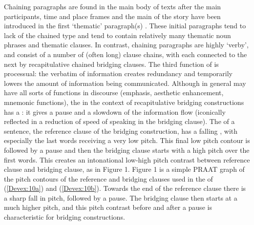 \documentclass[output=paper]{LSP/langsci}
\begin{document}
Chaining paragraphs are found in the main body of  texts after  the main participants, time and place frames and the main  of the story have been introduced in the first `thematic' paragraph(s) \citep[][369]{devries.2005}. These initial paragraphs tend to lack  of the chained type and tend to contain relatively many thematic noun phrases and thematic clauses. In contrast, chaining paragraphs are highly `verby', and consist of a number of (often long) clause chains, with each  connected to the next by recapitulative chained bridging clauses. The third function of  is processual: the verbatim   of information creates redundancy and temporarily lowers the amount of information being communicated. Although  in general may have all sorts of functions in discourse (emphasis, aesthetic enhancement, mnemonic functions), the  in the context of recapitulative bridging constructions has a : it gives a pause and a slowdown of the information flow (iconically reflected in a reduction of speed of speaking in the bridging clause). The  of a sentence, the reference clause of the bridging construction, has a falling , with especially the last words receiving a very low pitch. This final low pitch contour is followed by a pause and then the bridging clause starts with a high pitch over the first words. This creates an intonational low-high pitch contrast between reference clause and bridging clause, as in Figure 1. Figure 1 is a simple PRAAT graph of the pitch contours of the reference and bridging clauses used in the  of (\ref{Devex:10a}) and (\ref{Devex:10b}). Towards the end of the reference clause there is a sharp fall in pitch, followed by a pause. The bridging clause then starts at a much higher pitch, and this pitch contrast before and after a pause is characteristic for bridging constructions.\nocite{PRAAT}
\end{document}
